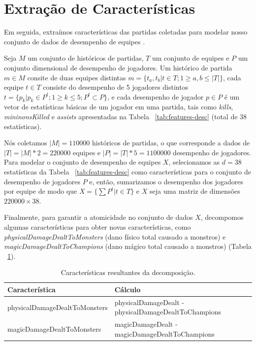 \section{Extração de Características}
Em seguida, extraímos características das partidas coletadas para modelar nosso conjunto de dados de desempenho de equipes .

Seja $M$ um conjunto de históricos de partidas, $T$ um conjunto de equipes e $P$ um conjunto dimensional de desempenho de jogadores. Um histórico de partida $m \in M$ consite de duas equipes distintas $m = \{ t_a, t_b | t \in {T}; 1 \geq a, b \leq |T| \}$, cada equipe $t \in T$ consiste do desempenho de 5 jogadores distintos $t=\{p_k |  p_k \in P^t; 1 \geq k \leq 5; P^t \subset P\}$, e cada desempenho de jogador $p \in P$ é um vetor de estatísticas básicas de um jogador em uma partida, tais como \textit{kills}, \textit{mininonsKilled} e \textit{assists} apresentadas na Tabela ~\ref{tab:features-desc} (total de 38 estatísticas).

Nós coletamos $|M|=110000$ históricos de partidas, o que corresponde a dados de $|T|= |M| * 2 = 220000$ equipes e $|P|=|T| * 5 = 1100000$ desempenho de jogadores. Para modelar o conjunto de desempenho de equipes $X$, selecionamos as $d=38$ estatísticas da Tabela ~\ref{tab:features-desc} como características para o conjunto de desempenho de jogadores $P$ e, então, sumarizamos o desempenho dos jogadores por equipe de modo que $ X=\{ \sum P^{t} | t \in T \} $ e $X$ seja uma matriz de dimensões $ 220000 \times 38 $.

Finalmente, para garantir a atomicidade no conjunto de dados $X$, decompomos algumas características para obter novas características, como \textit{physicalDamageDealtToMonsters} (dano físico total causado a monstros) e \textit{magicDamageDealtToChampions} (dano m\'agico total causado a monstros) (Tabela ~\ref{tab:decomposed-features}).

\begin{table}
  \scriptsize
  \caption{Características resultantes da decomposição.}
  \label{tab:decomposed-features}
  \begin{tabular}{p{}p{}}
    \toprule
    Característica & Cálculo \\
    \midrule
physicalDamageDealtToMonsters & physicalDamageDealt - physicalDamageDealtToChampions\\
magicDamageDealtToMonsters & magicDamageDealt - magicDamageDealtToChampions \\
  \bottomrule
\end{tabular}
\end{table}

